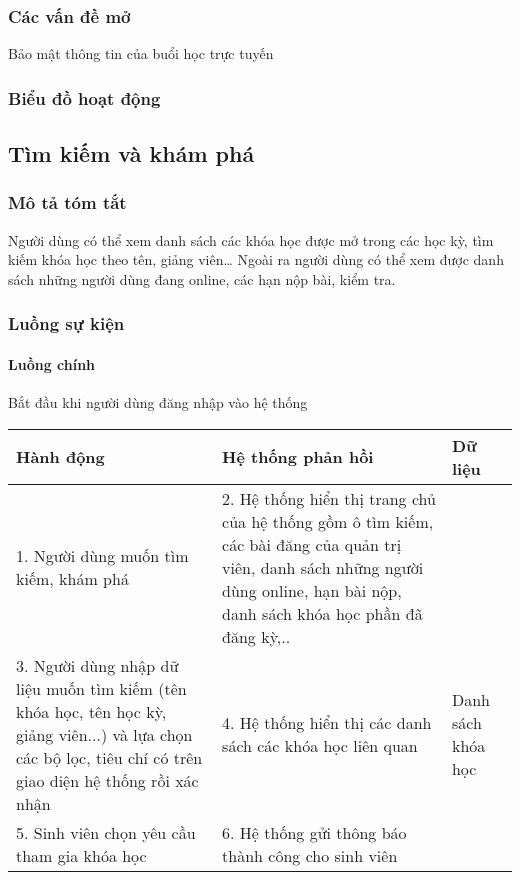 \documentclass[./../main_file.tex]{subfiles}
\begin{document}
\subsubsection{Các vấn đề mở}
Bảo mật thông tin của buổi học trực tuyến

\subsubsection{Biểu đồ hoạt động}

\subsection{Tìm kiếm và khám phá}
\subsubsection{Mô tả tóm tắt}
Người dùng có thể xem danh sách các khóa học được mở trong các học kỳ, tìm kiếm khóa học theo tên, giảng viên… Ngoài ra người dùng có thể xem được danh sách những người dùng đang online, các hạn nộp bài, kiểm tra.

\subsubsection{Luồng sự kiện}
\paragraph{Luồng chính}
Bắt đầu khi người dùng đăng nhập vào hệ thống
\begin{table}[H]
				\begin{tabular}{|p{.33\textwidth}|p{}|p{}|}
		\hline
		\textbf{Hành động}                          & \textbf{Hệ thống phản hồi}                         & \textbf{Dữ liệu} \\ \hline
		1. Người dùng muốn tìm kiếm, khám phá &
		2. Hệ thống hiển thị trang chủ của hệ thống gồm ô tìm kiếm, các bài đăng của quản trị viên, danh sách những người dùng online, hạn bài nộp, danh sách khóa học phần đã đăng kỳ,.. &
		\\ \hline
		3. Người dùng nhập dữ liệu muốn tìm kiếm (tên khóa học, tên học kỳ, giảng viên...) và lựa chọn các bộ lọc, tiêu chí có trên giao diện hệ thống rồi xác nhận &
		4. Hệ thống hiển thị các danh sách các khóa học liên quan &
		Danh sách khóa học \\ \hline
		5. Sinh viên chọn  yêu cầu tham gia khóa học & 6. Hệ thống gửi thông báo thành công cho sinh viên &                  \\ \hline
	\end{tabular}
\end{table}
\end{document}
